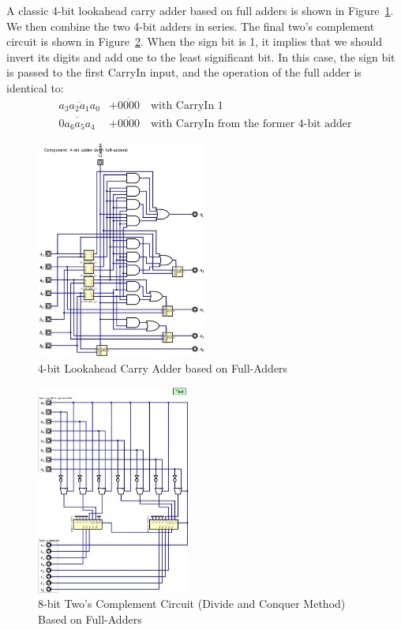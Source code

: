 \documentclass[conference]{IEEEtran}
\begin{document}
A classic 4-bit lookahead carry adder based on full adders is shown in Figure~\ref{fig:lca}. We then combine the two 4-bit adders in series. The final two's complement circuit is shown in Figure~\ref{fig:tc-dq}. When the
sign bit is 1, it implies that we should invert its digits and add one to the least significant bit. In this case, the sign bit is passed to the first CarryIn input, and the operation of the full adder is identical to:
\begin{align}\label{eq:carry-bits-result}
    \overline{a_3 a_2 a_1 a_0} &+ \overline{0000} \quad \text{with CarryIn } 1 \\
    \overline{0 a_6 a_5 a_4} &+ \overline{0000} \quad \text{with CarryIn from the former 4-bit adder}
\end{align}

\begin{figure}[h!]
    \centering
    \includegraphics[width=0.5\textwidth]{assets/adder_4bits.png}
    \caption{4-bit Lookahead Carry Adder based on Full-Adders}
    \label{fig:lca}
    \end{figure}


    \begin{figure}[h!]
        \centering
        \includegraphics[width=0.45\textwidth]{assets/twos_complement_dq.png}
        \caption{8-bit Two's Complement Circuit (Divide and Conquer Method) Based on Full-Adders}
        \label{fig:tc-dq}
        \end{figure}
\end{document}
